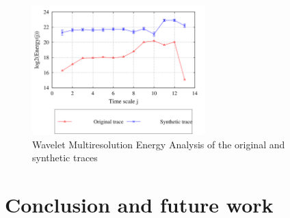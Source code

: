 

 


\begin{figure}[H]
        {\centering
        \includegraphics[height=50mm]{figures/qualification-WaveletMREA}
        \caption{Wavelet Multiresolution Energy Analysis of the original and synthetic traces}
        \label{fig:wavelet-mrea}\par}
\end{figure}


\section{Conclusion and future work}
\label{sec:conclusion-and-future-work}



